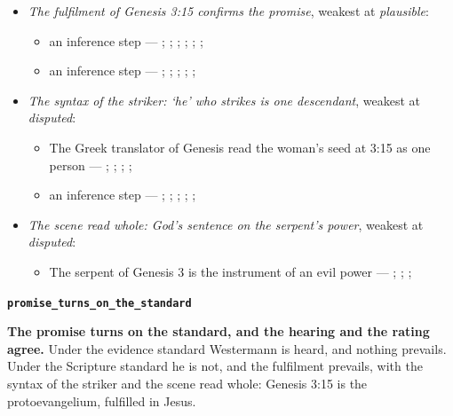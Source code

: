 \documentclass[11pt]{article}
\begin{document}
\begin{itemize}
\item \emph{The fulfilment of Genesis 3:15 confirms the promise}, weakest at \emph{plausible}:
\begin{itemize}
\item an inference step --- \cite[III.23.7]{irenaeus-against-heresies-180}; \cite[IV.40.3]{irenaeus-against-heresies-180}; \cite[42, 53]{hamilton-skull-crushing-seed-2006}; \cite[102]{keil-delitzsch-pentateuch-1866}; \cite[170]{leupold-exposition-genesis-1942}; \cite[170--171]{calvin-commentary-genesis-1847}; \cite[259--261]{westermann-genesis-1-11-1984}
\item an inference step --- \cite[167]{leupold-exposition-genesis-1942}; \cite[102]{keil-delitzsch-pentateuch-1866}; \cite[170--171]{calvin-commentary-genesis-1847}; \cite[146]{collins-syntactical-note-1997}; \cite[31]{hamilton-skull-crushing-seed-2006}; \cite[IV.40.3]{irenaeus-against-heresies-180}
\end{itemize}
\item \emph{The syntax of the striker: ‘he’ who strikes is one descendant}, weakest at \emph{disputed}:
\begin{itemize}
\item The Greek translator of Genesis read the woman’s seed at 3:15 as one person --- \cite[145]{collins-syntactical-note-1997}; \cite[144]{collins-syntactical-note-1997}; \cite{martin-earliest-messianic-1965}; \cite[300]{lewis-womans-seed-1991}; \cite[III.188]{philo-allegorical-interpretation-40}
\item an inference step --- \cite[144--146]{collins-syntactical-note-1997}; \cite[363, 364]{alexander-further-observations-1997}; \cite[166--168]{leupold-exposition-genesis-1942}; \cite[32]{hamilton-skull-crushing-seed-2006}; \cite[101]{keil-delitzsch-pentateuch-1866}; \cite[171]{calvin-commentary-genesis-1847}
\end{itemize}
\item \emph{The scene read whole: God’s sentence on the serpent’s power}, weakest at \emph{disputed}:
\begin{itemize}
\item The serpent of Genesis 3 is the instrument of an evil power --- \cite[146--147]{collins-syntactical-note-1997}; \cite[197]{woudstra-recent-translations-1971}; \cite[101--102]{keil-delitzsch-pentateuch-1866}; \cite[261]{westermann-genesis-1-11-1984}
\end{itemize}
\end{itemize}
\par\medskip\noindent\textbf{\texttt{promise\_\allowbreak{}turns\_\allowbreak{}on\_\allowbreak{}the\_\allowbreak{}standard}}\par\nobreak\noindent
\textbf{The promise turns on the standard, and the hearing and the rating agree.} Under the evidence standard Westermann is heard, and nothing prevails. Under the Scripture standard he is not, and the fulfilment prevails, with the syntax of the striker and the scene read whole: Genesis 3:15 is the protoevangelium, fulfilled in Jesus.
\end{document}
